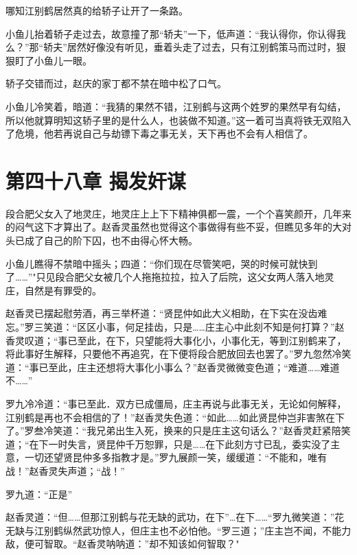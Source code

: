 \documentclass[12pt,oneside]{book}
\begin{document}
哪知江别鹤居然真的给轿子让开了一条路。

小鱼儿抬着轿子走过去，故意撞了那``轿夫''一下，低声道：``我认得你，你认得我么？''那``轿夫''居然好像没有听见，垂着头走了过去，只有江别鹤策马而过时，狠狠盯了小鱼儿一眼。

轿子交错而过，赵庆的家丁都不禁在暗中松了口气。

小鱼儿冷笑着，暗道：``我猜的果然不错，江别鹤与这两个姓罗的果然早有勾结，所以他就算明知这轿子里的是什么人，也装做不知道。''这一着可当真将铁无双陷入了危境，他若再说自己与劫镖下毒之事无关，天下再也不会有人相信了。

\hypertarget{ux7b2cux56dbux5341ux516bux7ae0-ux63edux53d1ux5978ux8c0b}{%
\chapter{第四十八章
揭发奸谋}\label{ux7b2cux56dbux5341ux516bux7ae0-ux63edux53d1ux5978ux8c0b}}

段合肥父女入了地灵庄，地灵庄上上下下精神俱都一震，一个个喜笑颜开，几年来的闷气这下才算出了。赵香灵虽然也觉得这个事做得有些不妥，但瞧见多年的大对头已成了自己的阶下囚，也不由得心怀大畅。

小鱼儿瞧得不禁暗中摇头；四道：``你们现在尽管笑吧，哭的时候可就快到了\ldots\ldots{}''"只见段合肥父女被几个人拖拖拉拉，拉入了后院，这父女两人落入地灵庄，自然是有罪受的。

赵香灵已摆起慰劳酒，再三举杯道：``贤昆仲如此大义相助，在下实在没齿难忘。''罗三笑道：``区区小事，何足挂齿，只是\ldots\ldots 庄主心中此刻不知是何打算？''赵香灵叹道；``事已至此，在下，只望能将大事化小，小事化无，等到江别鹤来了，将此事好生解释，只要他不再追究，在下便将段合肥放回去也罢了。''罗九忽然冷笑道：``事已至此，庄主还想将大事化小事么？''赵香灵微微变色道；``难道\ldots\ldots 难道不\ldots\ldots{}''

罗九冷冷道：``事已至此．双方已成僵局，庄主再说与此事无关，无论如何解释，江别鹤是再也不会相信的了！''赵香灵失色道：``如此\ldots\ldots 如此贤昆仲岂非害煞在下了。''罗叁冷笑道：``我兄弟出生入死，换来的只是庄主这句话么？''赵香灵赶紧陪笑道；``在下一时失言，贤昆仲千万恕罪，只是\ldots\ldots 在下此刻方寸已乱，委实没了主意，一切还望贤昆仲多多指教才是。''罗九展颜一笑，缓缓道：``不能和，唯有战！''赵香灵失声道；``战！''

罗九道：``正是''

赵香灵道：``但\ldots\ldots 但那江别鹤与花无缺的武功，在下''\ldots 在下\ldots\ldots{}``罗九微笑道：''花无缺与江别鹤纵然武功惊人，但庄主也不必怕他。``罗三道；''庄主岂不闻，不能力敌，便可智取。``赵香灵呐呐道：''却不知该如何智取？"
\end{document}
